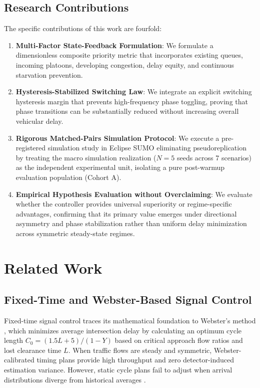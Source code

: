 \documentclass[11pt,journal,onecolumn]{article}
\begin{document}
\subsection{Research Contributions}
The specific contributions of this work are fourfold:
\begin{enumerate}
    \item \textbf{Multi-Factor State-Feedback Formulation}: We formulate a dimensionless composite priority metric that incorporates existing queues, incoming platoons, developing congestion, delay equity, and continuous starvation prevention.
    \item \textbf{Hysteresis-Stabilized Switching Law}: We integrate an explicit switching hysteresis margin that prevents high-frequency phase toggling, proving that phase transitions can be substantially reduced without increasing overall vehicular delay.
    \item \textbf{Rigorous Matched-Pairs Simulation Protocol}: We execute a pre-registered simulation study in Eclipse SUMO eliminating pseudoreplication by treating the macro simulation realization ($N = 5$ seeds across 7 scenarios) as the independent experimental unit, isolating a pure post-warmup evaluation population (Cohort A).
    \item \textbf{Empirical Hypothesis Evaluation without Overclaiming}: We evaluate whether the controller provides universal superiority or regime-specific advantages, confirming that its primary value emerges under directional asymmetry and phase stabilization rather than uniform delay minimization across symmetric steady-state regimes.
\end{enumerate}

\section{Related Work}
\subsection{Fixed-Time and Webster-Based Signal Control}
Fixed-time signal control traces its mathematical foundation to Webster's method \cite{webster1958traffic}, which minimizes average intersection delay by calculating an optimum cycle length $C_0 = (1.5L + 5)/(1 - Y)$ based on critical approach flow ratios and lost clearance time $L$. When traffic flows are steady and symmetric, Webster-calibrated timing plans provide high throughput and zero detector-induced estimation variance. However, static cycle plans fail to adjust when arrival distributions diverge from historical averages \cite{newell1989theory}.
\end{document}
